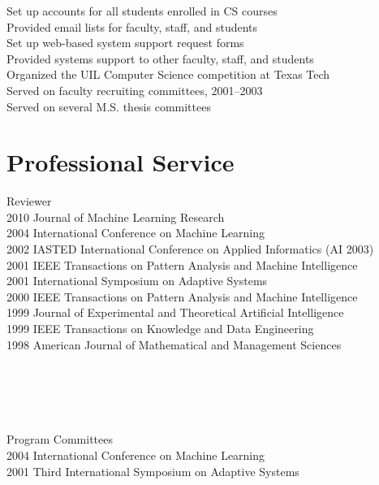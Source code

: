 \documentclass[10pt]{resume}
\begin{document}
{\hspace*{1em} Set up accounts for all students enrolled in CS courses\\
\hspace*{1em} Provided email lists for faculty, staff, and students\\
\hspace*{1em} Set up web-based system support request forms\\
\hspace*{1em} Provided systems support to other
faculty, staff, and students\\
Organized the UIL Computer Science competition at Texas Tech\\
Served on faculty recruiting committees, 2001--2003\\
Served on several M.S. thesis committees\\
}

\section{Professional Service}{Reviewer}
        {\\
2010 Journal of Machine Learning Research\\
2004 International Conference on Machine Learning\\
2002 IASTED International Conference on Applied Informatics (AI 2003)\\
2001 IEEE Transactions on Pattern Analysis and Machine Intelligence\\
2001 International Symposium on Adaptive Systems\\
2000 IEEE Transactions on Pattern Analysis and Machine Intelligence \\ 
1999 Journal of Experimental and Theoretical Artificial Intelligence\\
1999 IEEE Transactions on Knowledge and Data Engineering\\
\rm
1998 American Journal of Mathematical and Management Sciences\\
}

\section{\ }{Program Committees}
        {\\
2004 International Conference on Machine Learning\\
2001 Third International Symposium on Adaptive Systems \\
}
\end{document}
